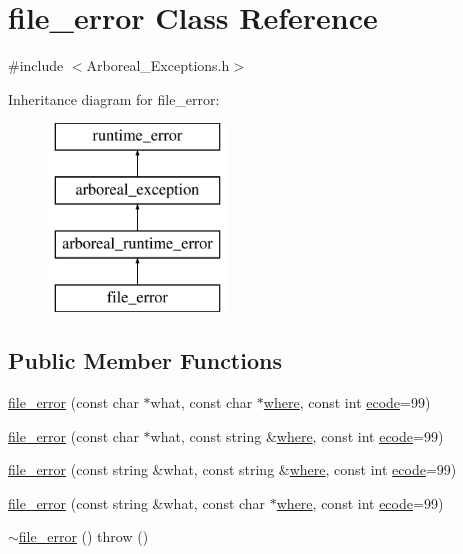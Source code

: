 \hypertarget{classfile__error}{}\section{file\+\_\+error Class Reference}
\label{classfile__error}


{\ttfamily \#include $<$Arboreal\+\_\+\+Exceptions.\+h$>$}

Inheritance diagram for file\+\_\+error\+:\begin{figure}[H]
\begin{center}
\leavevmode
\includegraphics[height=5.000000cm]{classfile__error}
\end{center}
\end{figure}
\subsection*{Public Member Functions}
\begin{DoxyCompactItemize}
\item 
\mbox{\hyperlink{classfile__error_a10da41c5d15b25fdafa97ae79523e242}{file\+\_\+error}} (const char $\ast$what, const char $\ast$\mbox{\hyperlink{classarboreal__exception_a802003dee586aaeb0b0d7ce909da2dad}{where}}, const int \mbox{\hyperlink{classarboreal__exception_a318e716601c544d92ff9af25edebd725}{ecode}}=99)
\item 
\mbox{\hyperlink{classfile__error_ae70ca16a0a8eee95a88a64128b7fcbad}{file\+\_\+error}} (const char $\ast$what, const string \&\mbox{\hyperlink{classarboreal__exception_a802003dee586aaeb0b0d7ce909da2dad}{where}}, const int \mbox{\hyperlink{classarboreal__exception_a318e716601c544d92ff9af25edebd725}{ecode}}=99)
\item 
\mbox{\hyperlink{classfile__error_a9b1c03f989df972ca3201f984ddece6d}{file\+\_\+error}} (const string \&what, const string \&\mbox{\hyperlink{classarboreal__exception_a802003dee586aaeb0b0d7ce909da2dad}{where}}, const int \mbox{\hyperlink{classarboreal__exception_a318e716601c544d92ff9af25edebd725}{ecode}}=99)
\item 
\mbox{\hyperlink{classfile__error_a2698ca75c20dd3ffc5adb8d470fff246}{file\+\_\+error}} (const string \&what, const char $\ast$\mbox{\hyperlink{classarboreal__exception_a802003dee586aaeb0b0d7ce909da2dad}{where}}, const int \mbox{\hyperlink{classarboreal__exception_a318e716601c544d92ff9af25edebd725}{ecode}}=99)
\item 
\mbox{\hyperlink{classfile__error_a2f95259fbe2944ce7eb6fddbd700b6de}{$\sim$file\+\_\+error}} ()  throw ()
\end{DoxyCompactItemize}
